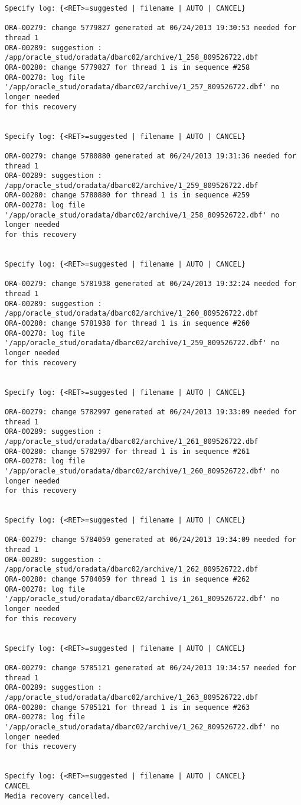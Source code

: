 \documentclass[11pt,a4paper,parskip=half]{scrartcl}
\begin{document}
\begin{lstlisting}
Specify log: {<RET>=suggested | filename | AUTO | CANCEL}

ORA-00279: change 5779827 generated at 06/24/2013 19:30:53 needed for thread 1
ORA-00289: suggestion :
/app/oracle_stud/oradata/dbarc02/archive/1_258_809526722.dbf
ORA-00280: change 5779827 for thread 1 is in sequence #258
ORA-00278: log file
'/app/oracle_stud/oradata/dbarc02/archive/1_257_809526722.dbf' no longer needed
for this recovery


Specify log: {<RET>=suggested | filename | AUTO | CANCEL}

ORA-00279: change 5780880 generated at 06/24/2013 19:31:36 needed for thread 1
ORA-00289: suggestion :
/app/oracle_stud/oradata/dbarc02/archive/1_259_809526722.dbf
ORA-00280: change 5780880 for thread 1 is in sequence #259
ORA-00278: log file
'/app/oracle_stud/oradata/dbarc02/archive/1_258_809526722.dbf' no longer needed
for this recovery


Specify log: {<RET>=suggested | filename | AUTO | CANCEL}

ORA-00279: change 5781938 generated at 06/24/2013 19:32:24 needed for thread 1
ORA-00289: suggestion :
/app/oracle_stud/oradata/dbarc02/archive/1_260_809526722.dbf
ORA-00280: change 5781938 for thread 1 is in sequence #260
ORA-00278: log file
'/app/oracle_stud/oradata/dbarc02/archive/1_259_809526722.dbf' no longer needed
for this recovery


Specify log: {<RET>=suggested | filename | AUTO | CANCEL}

ORA-00279: change 5782997 generated at 06/24/2013 19:33:09 needed for thread 1
ORA-00289: suggestion :
/app/oracle_stud/oradata/dbarc02/archive/1_261_809526722.dbf
ORA-00280: change 5782997 for thread 1 is in sequence #261
ORA-00278: log file
'/app/oracle_stud/oradata/dbarc02/archive/1_260_809526722.dbf' no longer needed
for this recovery


Specify log: {<RET>=suggested | filename | AUTO | CANCEL}

ORA-00279: change 5784059 generated at 06/24/2013 19:34:09 needed for thread 1
ORA-00289: suggestion :
/app/oracle_stud/oradata/dbarc02/archive/1_262_809526722.dbf
ORA-00280: change 5784059 for thread 1 is in sequence #262
ORA-00278: log file
'/app/oracle_stud/oradata/dbarc02/archive/1_261_809526722.dbf' no longer needed
for this recovery


Specify log: {<RET>=suggested | filename | AUTO | CANCEL}

ORA-00279: change 5785121 generated at 06/24/2013 19:34:57 needed for thread 1
ORA-00289: suggestion :
/app/oracle_stud/oradata/dbarc02/archive/1_263_809526722.dbf
ORA-00280: change 5785121 for thread 1 is in sequence #263
ORA-00278: log file
'/app/oracle_stud/oradata/dbarc02/archive/1_262_809526722.dbf' no longer needed
for this recovery


Specify log: {<RET>=suggested | filename | AUTO | CANCEL}
CANCEL
Media recovery cancelled.
\end{lstlisting}
\end{document}
